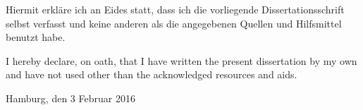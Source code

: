 \vspace{3cm}

{ 
Hiermit erkläre ich an Eides statt, dass ich die vorliegende 
Dissertationsschrift selbst verfasst 
und keine anderen als die angegebenen Quellen und Hilfsmittel benutzt habe.


I hereby declare, on oath, that I have written the present dissertation by my own and have not used other than the 
acknowledged resources and 
aids.

\vspace{2cm}
Hamburg, den 3 Februar 2016
}
\clearpage
